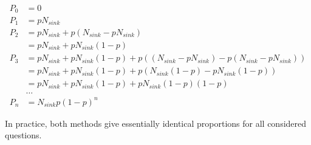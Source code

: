 $$ \begin{aligned} P_0 &= 0 \\ P_1 &= pN_{sink} \\ P_2 &= pN_{sink} + p(N_{sink} - pN_{sink}) \\ &= pN_{sink} + pN_{sink}(1-p) \\ P_3 &= pN_{sink} + pN_{sink}(1-p) + p((N_{sink}-pN_{sink}) - p(N_{sink}-pN_{sink})) \\ &= pN_{sink} + pN_{sink}(1-p)+p(N_{sink}(1-p)-pN_{sink}(1-p)) \\ &= pN_{sink}+pN_{sink}(1-p)+pN_{sink}(1-p)(1-p) \\ &\dots \\ P_n &=N_{sink}p(1-p)^n \end{aligned} $$

In practice, both methods give essentially identical proportions for all considered questions. 

